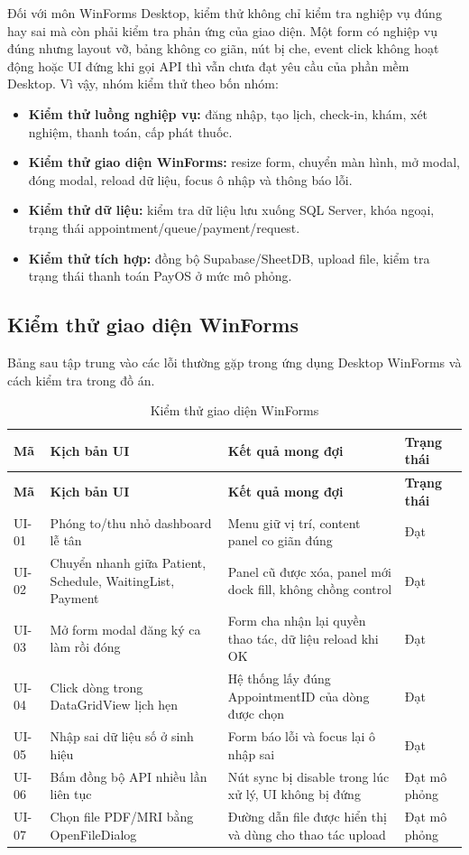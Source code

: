 \documentclass[12pt,a4paper]{article}
\numberwithin{figure}{subsection}
\numberwithin{table}{subsection}
\begin{document}
Đối với môn WinForms Desktop, kiểm thử không chỉ kiểm tra nghiệp vụ đúng hay sai mà còn phải kiểm tra phản ứng của giao diện. Một form có nghiệp vụ đúng nhưng layout vỡ, bảng không co giãn, nút bị che, event click không hoạt động hoặc UI đứng khi gọi API thì vẫn chưa đạt yêu cầu của phần mềm Desktop. Vì vậy, nhóm kiểm thử theo bốn nhóm:

\begin{itemize}
    \item \textbf{Kiểm thử luồng nghiệp vụ:} đăng nhập, tạo lịch, check-in, khám, xét nghiệm, thanh toán, cấp phát thuốc.
    \item \textbf{Kiểm thử giao diện WinForms:} resize form, chuyển màn hình, mở modal, đóng modal, reload dữ liệu, focus ô nhập và thông báo lỗi.
    \item \textbf{Kiểm thử dữ liệu:} kiểm tra dữ liệu lưu xuống SQL Server, khóa ngoại, trạng thái appointment/queue/payment/request.
    \item \textbf{Kiểm thử tích hợp:} đồng bộ Supabase/SheetDB, upload file, kiểm tra trạng thái thanh toán PayOS ở mức mô phỏng.
\end{itemize}

\subsection{Kiểm thử giao diện WinForms}

Bảng sau tập trung vào các lỗi thường gặp trong ứng dụng Desktop WinForms và cách kiểm tra trong đồ án.

\begin{longtable}{|p{2.4cm}|p{4.6cm}|p{4.2cm}|p{2.6cm}|}
\caption{Kiểm thử giao diện WinForms} \\
\hline
\textbf{Mã} & \textbf{Kịch bản UI} & \textbf{Kết quả mong đợi} & \textbf{Trạng thái} \\
\hline
\endfirsthead
\hline
\textbf{Mã} & \textbf{Kịch bản UI} & \textbf{Kết quả mong đợi} & \textbf{Trạng thái} \\
\hline
\endhead
UI-01 & Phóng to/thu nhỏ dashboard lễ tân & Menu giữ vị trí, content panel co giãn đúng & Đạt \\
\hline
UI-02 & Chuyển nhanh giữa Patient, Schedule, WaitingList, Payment & Panel cũ được xóa, panel mới dock fill, không chồng control & Đạt \\
\hline
UI-03 & Mở form modal đăng ký ca làm rồi đóng & Form cha nhận lại quyền thao tác, dữ liệu reload khi OK & Đạt \\
\hline
UI-04 & Click dòng trong DataGridView lịch hẹn & Hệ thống lấy đúng AppointmentID của dòng được chọn & Đạt \\
\hline
UI-05 & Nhập sai dữ liệu số ở sinh hiệu & Form báo lỗi và focus lại ô nhập sai & Đạt \\
\hline
UI-06 & Bấm đồng bộ API nhiều lần liên tục & Nút sync bị disable trong lúc xử lý, UI không bị đứng & Đạt mô phỏng \\
\hline
UI-07 & Chọn file PDF/MRI bằng OpenFileDialog & Đường dẫn file được hiển thị và dùng cho thao tác upload & Đạt mô phỏng \\
\hline
\end{longtable}
\end{document}
